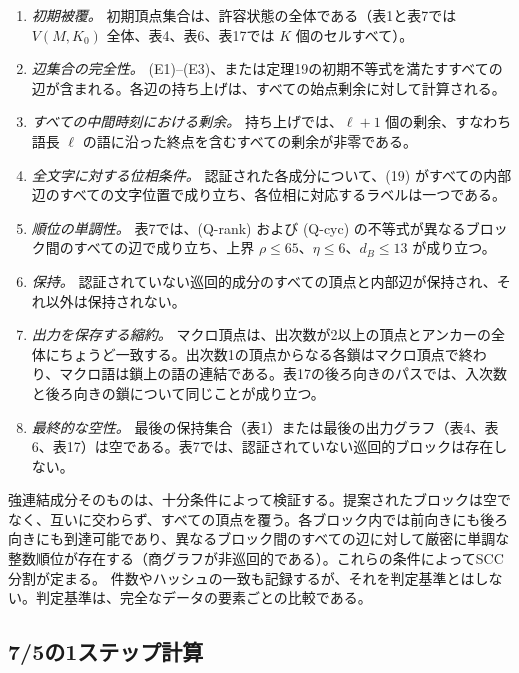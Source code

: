 \documentclass[11pt,reqno]{amsart}
\theoremstyle{definition}
\theoremstyle{definition}
\theoremstyle{remark}
\providecommand{\tightlist}{\setlength{\itemsep}{0pt}\setlength{\parskip}{0pt}}
\begin{document}
\begin{enumerate}
\def\labelenumi{\arabic{enumi}.}
\tightlist
\item
  \emph{初期被覆。} 初期頂点集合は、許容状態の全体である（表1と表7では \(V(M,K_0)\) 全体、表4、表6、表17では \(K\) 個のセルすべて）。
\item
  \emph{辺集合の完全性。} (E1)--(E3)、または定理19の初期不等式を満たすすべての辺が含まれる。各辺の持ち上げは、すべての始点剰余に対して計算される。
\item
  \emph{すべての中間時刻における剰余。} 持ち上げでは、\(\ell+1\) 個の剰余、すなわち語長 \(\ell\) の語に沿った終点を含むすべての剰余が非零である。
\item
  \emph{全文字に対する位相条件。} 認証された各成分について、(19) がすべての内部辺のすべての文字位置で成り立ち、各位相に対応するラベルは一つである。
\item
  \emph{順位の単調性。} 表7では、(Q-rank) および (Q-cyc) の不等式が異なるブロック間のすべての辺で成り立ち、上界 \(\rho\le65\)、\(\eta\le6\)、\(d_B\le13\) が成り立つ。
\item
  \emph{保持。} 認証されていない巡回的成分のすべての頂点と内部辺が保持され、それ以外は保持されない。
\item
  \emph{出力を保存する縮約。} マクロ頂点は、出次数が2以上の頂点とアンカーの全体にちょうど一致する。出次数1の頂点からなる各鎖はマクロ頂点で終わり、マクロ語は鎖上の語の連結である。表17の後ろ向きのパスでは、入次数と後ろ向きの鎖について同じことが成り立つ。
\item
  \emph{最終的な空性。} 最後の保持集合（表1）または最後の出力グラフ（表4、表6、表17）は空である。表7では、認証されていない巡回的ブロックは存在しない。
\end{enumerate}

強連結成分そのものは、十分条件によって検証する。提案されたブロックは空でなく、互いに交わらず、すべての頂点を覆う。各ブロック内では前向きにも後ろ向きにも到達可能であり、異なるブロック間のすべての辺に対して厳密に単調な整数順位が存在する（商グラフが非巡回的である）。これらの条件によってSCC分割が定まる。
件数やハッシュの一致も記録するが、それを判定基準とはしない。判定基準は、完全なデータの要素ごとの比較である。

\subsection{7/5の1ステップ計算}\label{sec:9.2}
\end{document}
